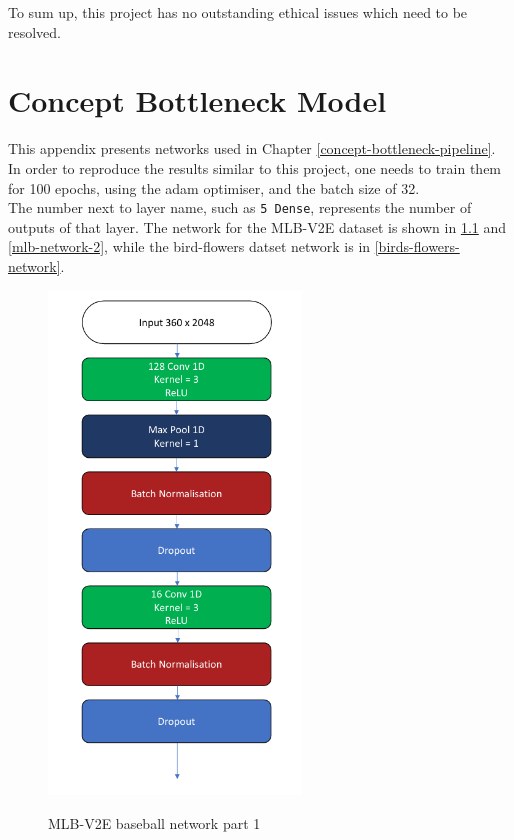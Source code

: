 To sum up, this project has no outstanding ethical issues which need to be resolved.

\chapter{Concept Bottleneck Model}
\label{concept-bottleneck-architectures}

This appendix presents networks used in Chapter \ref{concept-bottleneck-pipeline}.
In order to reproduce the results similar to this project, one needs to train them for 100 epochs, using the adam optimiser, and the batch size of 32. \\
The number next to layer name, such as \verb_5 Dense_, represents the number of outputs of that layer.
The network for the MLB-V2E dataset is shown in \ref{mlb-network-1} and \ref{mlb-network-2}, while the bird-flowers datset network is in \ref{birds-flowers-network}.

\begin{figure}[h]
\caption{MLB-V2E baseball network part 1}
\vspace{10pt}
\centering
\includegraphics[width=0.6\textwidth]{appendix/mlb-network part 1.png}
\label{mlb-network-1}
\end{figure}

